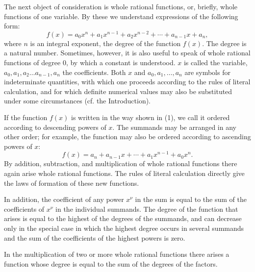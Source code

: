\documentclass[11pt]{article}
\begin{document}
The next object of consideration is whole rational functions, or, briefly, whole functions of one variable. By these we understand expressions of the following form:
\begin{equation}
 f(x)=a_0x^n+a_1x^{n-1}+a_2x^{n-2}+\cdots+a_{n-1}x+a_n,
\tag{1}
\end{equation}
where $n$ is an integral exponent, the degree of the function $f(x)$. The degree is a natural number. Sometimes, however, it is also useful to speak of whole rational functions of degree $0$, by which a constant is understood. $x$ is called the variable, $a_0,a_1,a_2\ldots a_{n-1},a_n$ the coefficients. Both $x$ and $a_0,a_1,\ldots,a_n$ are symbols for indeterminate quantities, with which one proceeds according to the rules of literal calculation, and for which definite numerical values may also be substituted under some circumstances (cf. the Introduction).

If the function $f(x)$ is written in the way shown in (1), we call it ordered according to descending powers of $x$. The summands may be arranged in any other order; for example, the function may also be ordered according to ascending powers of $x$:
\[
 f(x)=a_n+a_{n-1}x+\cdots+a_1x^{n-1}+a_0x^n.
\]
By addition, subtraction, and multiplication of whole rational functions there again arise whole rational functions. The rules of literal calculation directly give the laws of formation of these new functions.

In addition, the coefficient of any power $x^\nu$ in the sum is equal to the sum of the coefficients of $x^\nu$ in the individual summands. The degree of the function that arises is equal to the highest of the degrees of the summands, and can decrease only in the special case in which the highest degree occurs in several summands and the sum of the coefficients of the highest powers is zero.

In the multiplication of two or more whole rational functions there arises a function whose degree is equal to the sum of the degrees of the factors.
\end{document}
